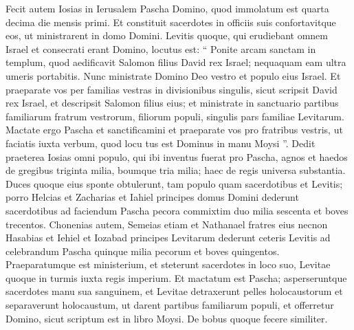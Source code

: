\begin{biblechapter}
\begin{biblechapter}
\begin{biblechapter}
\begin{biblechapter}
\begin{biblechapter}
\begin{biblechapter}
\begin{biblechapter}
\begin{biblechapter}
\begin{biblechapter}
\begin{biblechapter}
\begin{biblechapter}
\begin{biblechapter}
\begin{biblechapter}
\begin{biblechapter}
\begin{biblechapter}
\begin{biblechapter}
\begin{biblechapter}
\begin{biblechapter}
\begin{biblechapter}
\begin{biblechapter}
\begin{biblechapter}
\begin{biblechapter}
\begin{biblechapter}
\begin{biblechapter}
\begin{biblechapter}
\begin{biblechapter}
\begin{biblechapter}
\begin{biblechapter}
\begin{biblechapter}
\begin{biblechapter}
\begin{biblechapter}
\begin{biblechapter}
\begin{biblechapter}
\begin{biblechapter}
\begin{biblechapter}
\verse Fecit autem Iosias in Ierusalem Pascha Domino, quod immolatum est quarta decima die mensis primi. 
\verse Et constituit sacerdotes in officiis suis confortavitque eos, ut ministrarent in domo Domini. 
\verse Levitis quoque, qui erudiebant omnem Israel et consecrati erant Domino, locutus est: “ Ponite arcam sanctam in templum, quod aedificavit Salomon filius David rex Israel; nequaquam eam ultra umeris portabitis. Nunc ministrate Domino Deo vestro et populo eius Israel. 
\verse Et praeparate vos per familias vestras in divisionibus singulis, sicut scripsit David rex Israel, et descripsit Salomon filius eius; 
\verse et ministrate in sanctuario partibus familiarum fratrum vestrorum, filiorum populi, singulis pars familiae Levitarum. 
\verse Mactate ergo Pascha et sanctificamini et praeparate vos pro fratribus vestris, ut faciatis iuxta verbum, quod locu tus est Dominus in manu Moysi ”. 
\verse Dedit praeterea Iosias omni populo, qui ibi inventus fuerat pro Pascha, agnos et haedos de gregibus triginta milia, boumque tria milia; haec de regis universa substantia. 
\verse Duces quoque eius sponte obtulerunt, tam populo quam sacerdotibus et Levitis; porro Helcias et Zacharias et Iahiel principes domus Domini dederunt sacerdotibus ad faciendum Pascha pecora commixtim duo milia sescenta et boves trecentos. 
\verse Chonenias autem, Semeias etiam et Nathanael fratres eius necnon Hasabias et Iehiel et Iozabad principes Levitarum dederunt ceteris Levitis ad celebrandum Pascha quinque milia pecorum et boves quingentos.
 \verse Praeparatumque est ministerium, et steterunt sacerdotes in loco suo, Levitae quoque in turmis iuxta regis imperium. 
\verse Et mactatum est Pascha; asperseruntque sacerdotes manu sua sanguinem, et Levitae detraxerunt pelles holocaustorum 
\verse et separaverunt holocaustum, ut darent partibus familiarum populi, et offerretur Domino, sicut scriptum est in libro Moysi. De bobus quoque fecere similiter. 

\end{biblechapter}
\end{biblechapter}
\end{biblechapter}
\end{biblechapter}
\end{biblechapter}
\end{biblechapter}
\end{biblechapter}
\end{biblechapter}
\end{biblechapter}
\end{biblechapter}
\end{biblechapter}
\end{biblechapter}
\end{biblechapter}
\end{biblechapter}
\end{biblechapter}
\end{biblechapter}
\end{biblechapter}
\end{biblechapter}
\end{biblechapter}
\end{biblechapter}
\end{biblechapter}
\end{biblechapter}
\end{biblechapter}
\end{biblechapter}
\end{biblechapter}
\end{biblechapter}
\end{biblechapter}
\end{biblechapter}
\end{biblechapter}
\end{biblechapter}
\end{biblechapter}
\end{biblechapter}
\end{biblechapter}
\end{biblechapter}
\end{biblechapter}
